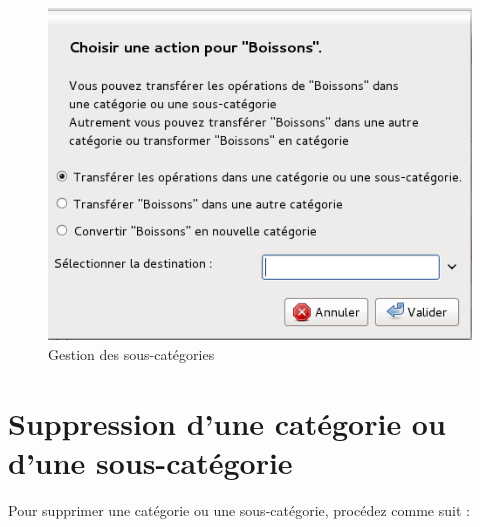 \ifIllustration
\begin{figure}[htbp]
\begin{center}
\includegraphics[scale=0.5]{image/screenshot/categories_management}
\end{center}
\caption{Gestion des sous-catégories}
\label{categories-management-img}
\end{figure}
\fi

%
\section{Suppression d'une catégorie ou d'une sous-catégorie\label{categories-delete}}


Pour supprimer une catégorie ou une sous-catégorie, procédez comme suit :

